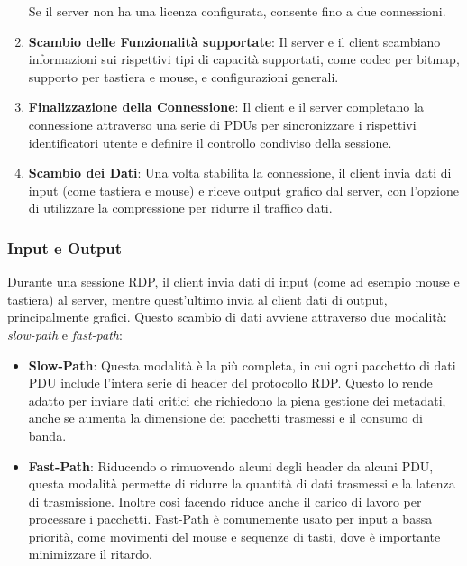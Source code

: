 \documentclass[12pt,a4paper,openright,twoside]{book}
\begin{document}
\begin{enumerate}
    Se il server non ha una licenza configurata, consente fino a due connessioni.
    \item \textbf{Scambio delle Funzionalità supportate}: Il server e il client scambiano informazioni sui rispettivi tipi di capacità supportati, come codec per bitmap,
    supporto per tastiera e mouse, e configurazioni generali.
    \item \textbf{Finalizzazione della Connessione}: Il client e il server completano la connessione attraverso una serie di \ac{PDU}s per sincronizzare i rispettivi identificatori utente e definire il controllo condiviso della sessione.
    \item \textbf{Scambio dei Dati}: Una volta stabilita la connessione, il client invia dati di input (come tastiera e mouse) e riceve output grafico dal server,
    con l’opzione di utilizzare la compressione per ridurre il traffico dati.
\end{enumerate}

\subsubsection{Input e Output}
Durante una sessione \ac{RDP}, il client invia dati di input (come ad esempio mouse e tastiera) al server, mentre quest'ultimo invia al client dati di output, principalmente grafici.
Questo scambio di dati avviene attraverso due modalità: \textit{slow-path} e \textit{fast-path}:
\begin{itemize}
    \item \textbf{Slow-Path}: Questa modalità è la più completa, in cui ogni pacchetto di dati \ac{PDU} include l'intera serie di header del protocollo \ac{RDP}.
    Questo lo rende adatto per inviare dati critici che richiedono la piena gestione dei metadati, anche se aumenta la dimensione dei pacchetti trasmessi e il consumo di banda.
    \item \textbf{Fast-Path}: Riducendo o rimuovendo alcuni degli header da alcuni \ac{PDU},
    questa modalità permette di ridurre la quantità di dati trasmessi e la latenza di trasmissione.
    Inoltre così facendo riduce anche il carico di lavoro per processare i pacchetti.
    Fast-Path è comunemente usato per input a bassa priorità, come movimenti del mouse e sequenze di tasti, dove è importante minimizzare il ritardo.
\end{itemize}
\end{document}
